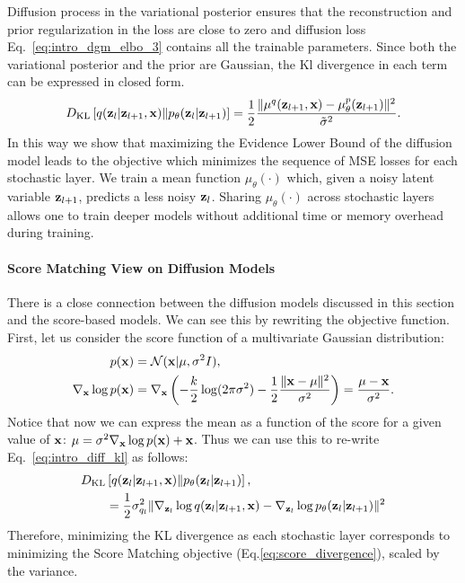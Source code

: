 Diffusion process in the variational posterior ensures that the reconstruction and prior regularization in the loss are close to zero and diffusion loss Eq.~\ref{eq:intro_dgm_elbo_3} contains all the trainable parameters. Since both the variational posterior and the prior are Gaussian, the Kl divergence in each term can be expressed in closed form.
\begin{equation}\label{eq:intro_diff_kl}
    \KL{q(\rvz_l|\rvz_{l+1}, \rvx)}{p_{\theta}(\rvz_l|\rvz_{l+1})} = \frac 12 \frac{\|\mu^q(\rvz_{l+1}, \rvx) - \mu^p_{\theta}(\rvz_{l+1})\|^2}{\tilde{\sigma}^2}.
\end{equation}
In this way we show that maximizing the Evidence Lower Bound of the diffusion model leads to the objective which minimizes the sequence of MSE losses for each stochastic layer. We train a mean function $\mu_{\theta}(\cdot)$ which, given a noisy latent variable ${\mathbf{z}}_{l+1}$, predicts a less noisy ${\mathbf{z}}_l$. Sharing $\mu_{\theta}(\cdot)$ across stochastic layers allows one to train deeper models without additional time or memory overhead during training. 

\paragraph{Score Matching View on Diffusion Models}
There is a close connection between the diffusion models discussed in this section and the score-based models.  We can see this by rewriting the objective function. 
First, let us consider the score function of a multivariate Gaussian distribution:
\begin{align}
    p({\mathbf{x}}) &= \mathcal{N}({\mathbf{x}}|\mu, \sigma^2I),\\
    \nabla_{{\mathbf{x}}}\log p({\mathbf{x}}) &= \nabla_{{\mathbf{x}}}\left(-\frac k2 \log(2\pi\sigma^2) - \frac12 \frac{\|{\mathbf{x}} - \mu\|^2}{\sigma^2}\right) = \frac{\mu - {\mathbf{x}}}{\sigma^2}. 
\end{align}
Notice that now we can express the mean as a function of the score for a given value of ${\mathbf{x}}$: $ \mu  = \sigma^2 \nabla_{{\mathbf{x}}}\log p({\mathbf{x}}) + {\mathbf{x}}$. Thus we can use this to re-write Eq.~\ref{eq:intro_diff_kl} as follows:
\begin{align}
    &D_{\mathrm{KL}}\left[q({\mathbf{z}}_l|{\mathbf{z}}_{l+1}, {\mathbf{x}})\|p_{\theta}({\mathbf{z}}_l|{\mathbf{z}}_{l+1})\right], \\
    &\quad\quad= \frac 12 \sigma_{q_l}^2 \|\nabla_{{\mathbf{z}}_l}\log q({\mathbf{z}}_l|{\mathbf{z}}_{l+1}, {\mathbf{x}})  - \nabla_{{\mathbf{z}}_l}\log p_{\theta}({\mathbf{z}}_l|{\mathbf{z}}_{l+1})\|^2
\end{align}
Therefore, minimizing the KL divergence as each stochastic layer corresponds to minimizing the Score Matching objective (Eq.\ref{eq:score_divergence}), scaled by the variance. 

